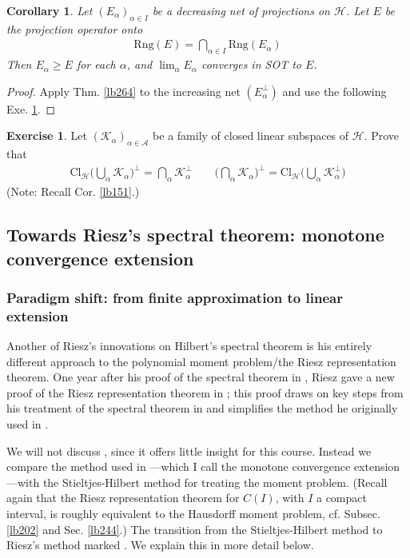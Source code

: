 \documentclass[12pt,b5paper,notitlepage]{article}
\theoremstyle{definition}
\newtheorem{exe}[df]{Exercise}
\theoremstyle{plain}
\newtheorem{co}[df]{Corollary}
\newcommand{\scr}{\mathscr}
\newcommand{\Rng}{\mathrm{Rng}}
\newcommand{\Cl}{\mathrm{Cl}}
\newcommand{\MH}{\mathcal H}
\newcommand{\MK}{\mathcal K}
\numberwithin{equation}{section}
\begin{document}
\begin{co}\label{lb266}
Let $(E_\alpha)_{\alpha\in I}$ be a decreasing net of projections on $\MH$. Let $E$ be the projection operator onto
\begin{align*}
\Rng(E)=\bigcap_{\alpha\in I}\Rng(E_\alpha)
\end{align*}
Then $E_\alpha\geq E$ for each $\alpha$, and $\lim_\alpha E_\alpha$ converges in SOT to $E$.
\end{co}


\begin{proof}
Apply Thm. \ref{lb264} to the increasing net $(E_\alpha^\perp)$ and use the following Exe. \ref{lb265}.
\end{proof}


\begin{exe}\label{lb265}
Let $(\MK_\alpha)_{\alpha\in\scr A}$ be a family of closed linear subspaces of $\MH$. Prove that
\begin{gather}
\Cl_\MH\Big(\bigcup_\alpha\MK_\alpha\Big)^\perp=\bigcap_\alpha\MK_\alpha^\perp \qquad\Big(\bigcap_\alpha \MK_\alpha\Big)^\perp=\Cl_\MH\Big(\bigcup_\alpha\MK_\alpha^\perp\Big)
\end{gather}
(Note: Recall Cor. \ref{lb151}.)
\end{exe}





\subsection{Towards Riesz's spectral theorem: monotone convergence extension}\label{lb257}


\subsubsection{Paradigm shift: from finite approximation to linear extension}\label{lb290}


Another of Riesz's innovations on Hilbert's spectral theorem is his entirely different approach to the polynomial moment problem/the Riesz representation theorem. One year after his proof of the spectral theorem in \cite{Rie13}, Riesz gave a new proof of the Riesz representation theorem in \cite{Rie14}; this proof draws on key steps from his treatment of the spectral theorem in \cite{Rie13} and simplifies the method he originally used in \cite{Rie09}.

We will not discuss \cite{Rie09}, since it offers little insight for this course. Instead we compare the method used in \cite{Rie13,Rie14}---which I call the monotone convergence extension---with the Stieltjes-Hilbert method for treating the moment problem. (Recall again that the Riesz representation theorem for $C(I)$, with $I$ a compact interval, is roughly equivalent to the Hausdorff moment problem, cf. Subsec. \ref{lb202} and Sec. \ref{lb244}.) The transition from the Stieltjes-Hilbert method to Riesz's method marked . We explain this in more detail below.
\end{document}
